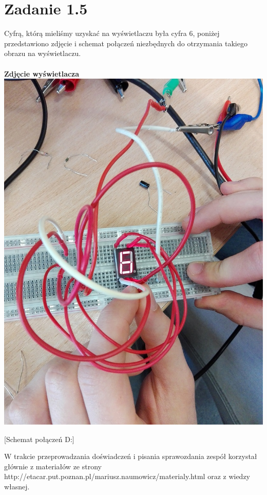 \documentclass[polish,a4paper]{article}
\begin{document}
\section{Zadanie 1.5}
Cyfrą, którą mieliśmy uzyskać na wyświetlaczu była cyfra 6, poniżej przedstawiono zdjęcie i schemat połączeń niezbędnych do otrzymania takiego obrazu na wyświetlaczu.\\
\\
\textbf{Zdjęcie wyświetlacza}\\
\includegraphics[width=\textwidth]{cyfra2}




[Schemat połączeń D:]




\begin{thebibliography}{9}

  W trakcie przeprowadzania doświadczeń i pisania sprawozdania zespół korzystał głównie z materiałów ze strony http://etacar.put.poznan.pl/mariusz.naumowicz/materialy.html oraz z wiedzy własnej.

\end{thebibliography}
\end{document}
